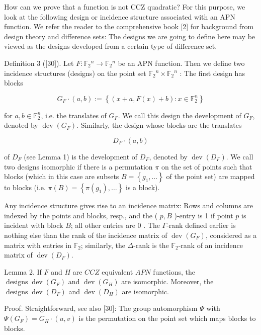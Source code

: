 \documentclass[10pt]{article}
\begin{document}
How can we prove that a function is not CCZ quadratic? For this purpose, we look at the following design or incidence structure associated with an APN function. We refer the reader to the comprehensive book [2] for background from design theory and difference sets: The designs we are going to define here may be viewed as the designs developed from a certain type of difference set.

Definition 3 ([30]). Let $F: \mathbb{F}_{2}{ }^{n} \rightarrow \mathbb{F}_{2}{ }^{n}$ be an APN function. Then we define two incidence structures (designs) on the point set $\mathbb{F}_{2}{ }^{n} \times \mathbb{F}_{2}{ }^{n}$ : The first design has blocks

$$
G_{F} \cdot(a, b):=\left\{(x+a, F(x)+b): x \in \mathbb{F}_{2}^{n}\right\}
$$

for $a, b \in \mathbb{F}_{2}^{n}$, i.e. the translates of $G_{F}$. We call this design the development of $G_{F}$, denoted by $\operatorname{dev}\left(G_{F}\right)$. Similarly, the design whose blocks are the translates

$$
D_{F} \cdot(a, b)
$$

of $D_{F}$ (see Lemma 1) is the development of $D_{F}$, denoted by $\operatorname{dev}\left(D_{F}\right)$. We call two designs isomorphic if there is a permutation $\pi$ on the set of points such that blocks (which in this case are subsets $B=\left\{g_{1}, \ldots\right\}$ of the point set) are mapped to blocks (i.e. $\pi(B)=\left\{\pi\left(g_{1}\right), \ldots\right\}$ is a block).

Any incidence structure gives rise to an incidence matrix: Rows and columns are indexed by the points and blocks, resp., and the ( $p, B$ )-entry is 1 if point $p$ is incident with block $B$; all other entries are 0 . The $\Gamma$-rank defined earlier is nothing else than the rank of the incidence matrix of $\operatorname{dev}\left(G_{F}\right)$, considered as a matrix with entries in $\mathbb{F}_{2}$; similarly, the $\Delta$-rank is the $\mathbb{F}_{2}$-rank of an incidence matrix of $\operatorname{dev}\left(D_{F}\right)$.

Lemma 2. If $F$ and $H$ are $C C Z$ equivalent $A P N$ functions, the $\operatorname{designs} \operatorname{dev}\left(G_{F}\right)$ and $\operatorname{dev}\left(G_{H}\right)$ are isomorphic. Moreover, the $\operatorname{designs} \operatorname{dev}\left(D_{F}\right)$ and $\operatorname{dev}\left(D_{H}\right)$ are isomorphic.

Proof. Straightforward, see also [30]: The group automorphism $\Psi$ with $\Psi\left(G_{F}\right)=G_{H} \cdot(u, v)$ is the permutation on the point set which maps blocks to blocks.
\end{document}
